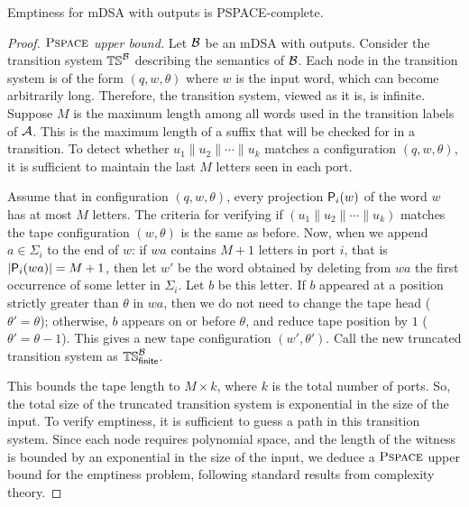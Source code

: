 
\begin{theorem}
Emptiness for mDSA with outputs is PSPACE-complete.
\end{theorem}
\begin{proof}
    \emph{$\operatorname{\textsc{Pspace}}$ upper bound.} Let $\mathcal{B}$ be an mDSA with outputs. Consider the transition system $\mathbb{TS}^{\mathcal{B}}$ describing the semantics of $\mathcal{B}$. Each node in the transition system is of the form $(q, w, \theta)$ where $w$ is the input word, which can become arbitrarily long. Therefore, the transition system, viewed as it is, is infinite. Suppose $M$ is the maximum length among all words used in the transition labels of $\mathcal{A}$. This is the maximum length of a suffix that will be checked for in a transition. To detect whether $u_1 \parallel u_2 \parallel \cdots \parallel u_k$ matches a configuration $(q, w, \theta)$, it is sufficient to maintain the last $M$ letters seen in each port. 
    
    Assume that in configuration $(q, w, \theta)$, every projection $\mathsf{P}_{i}(w)$ of the word $w$ has at most $M$ letters. The criteria for verifying if $(u_1 \parallel u_2 \parallel \cdots \parallel u_k)$ matches the tape configuration $(w, \theta)$ is the same as before. Now, when we append $a \in \Sigma_i$ to the end of $w$: if $wa$ contains $M+1$ letters in port $i$, that is $|\mathsf{P}_{i}(wa)| = M+1$, then let $w'$ be the word obtained by deleting from $wa$ the first occurrence of some letter in $\Sigma_i$. Let $b$ be this letter. If $b$ appeared at a position strictly greater than $\theta$ in $wa$, then we do not need to change the tape head ($\theta' = \theta$); otherwise, $b$ appears on or before $\theta$, and reduce tape position by $1$ ($\theta' = \theta - 1$). This gives a new tape configuration $(w', \theta')$. Call the new truncated transition system as $\mathbb{TS}_{\mathsf{finite}}^{\mathcal{B}}$.
    
    
    This bounds the tape length to $M \times k$, where $k$ is the total number of ports. So, the total size of the truncated transition system is exponential in the size of the input. To verify emptiness, it is sufficient to guess a path in this transition system. Since each node requires polynomial space, and the length of the witness is bounded by an exponential in the size of the input, we deduce a $\operatorname{\textsc{Pspace}}$ upper bound for the emptiness problem, following standard results from complexity theory.


\end{proof}
